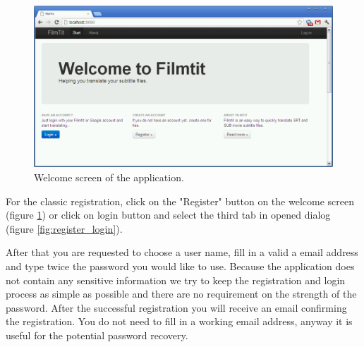 \begin{figure}[h]
\begin{center}
\includegraphics[scale=0.4]{figures/user_manual/welcome_screen.png}
\end{center}
\caption{Welcome screen of the application.}
\label{fig:welcome}
\end{figure}

For the classic registration, click on the "Register" button on the welcome screen (figure \ref{fig:welcome}) or click on login button and select the third tab in opened dialog (figure \ref{fig:register_login}).

After that you are requested to choose a user name, fill in a valid a email address and type twice the password you would like to use. Because the application does not contain any sensitive information we try to keep the registration and login process as simple as possible and there are no requirement on the strength of the password. After the successful registration you will receive an email confirming the registration. You do not need to fill in a working email address, anyway it is useful for the potential password recovery.

